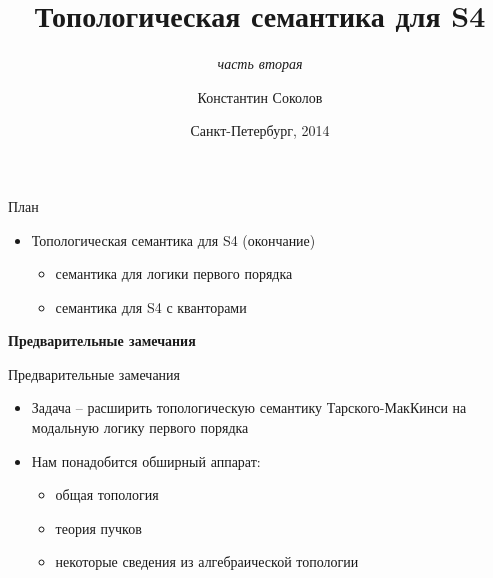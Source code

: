 \documentclass{beamer}
\begin{document}
\title{\Large{Топологическая семантика для S4}}
\subtitle{\textit{часть вторая}}
\author{Константин Соколов}
\date{Санкт-Петербург, 2014} 
\begin{frame}
    \thispagestyle{empty}
    \titlepage
\end{frame}

\begin{frame}{План}
\setcounter{framenumber}{1}
    \begin{itemize}
        \item Топологическая семантика для S4 (окончание)
        	\medskip
        	\begin{itemize}
				\item семантика для логики первого порядка
				\item семантика для S4 с кванторами
        	\end{itemize}
    \end{itemize}
\end{frame}






\begin{frame}{}
\begin{center}
	\textbf{Предварительные замечания}
\end{center}
\end{frame}

\begin{frame}{Предварительные замечания}
\begin{itemize}
	\item Задача -- расширить топологическую семантику Тарского-МакКинси на модальную логику первого порядка
	\medskip
	\item Нам понадобится обширный аппарат:
		\smallskip
		\begin{itemize}
			\item общая топология
			\item теория пучков
			\item некоторые сведения из алгебраической топологии
		\end{itemize}
\end{itemize}
\end{frame}
\end{document}
